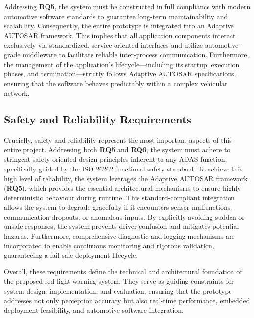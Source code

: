 Addressing \textbf{RQ5}, the system must be constructed in full compliance with modern automotive software standards to guarantee long-term maintainability and scalability. Consequently, the entire prototype is integrated into an Adaptive AUTOSAR framework. This implies that all application components interact exclusively via standardized, service-oriented interfaces and utilize automotive-grade middleware to facilitate reliable inter-process communication. Furthermore, the management of the application's lifecycle---including its startup, execution phases, and termination---strictly follows Adaptive AUTOSAR specifications, ensuring that the software behaves predictably within a complex vehicular network.

\subsection{Safety and Reliability Requirements}
Crucially, safety and reliability represent the most important aspects of this entire project. Addressing both \textbf{RQ5} and \textbf{RQ6}, the system must adhere to stringent safety-oriented design principles inherent to any ADAS function, specifically guided by the ISO 26262 functional safety standard. To achieve this high level of reliability, the system leverages the Adaptive AUTOSAR framework (\textbf{RQ5}), which provides the essential architectural mechanisms to ensure highly deterministic behaviour during runtime. This standard-compliant integration allows the system to degrade gracefully if it encounters sensor malfunctions, communication dropouts, or anomalous inputs. By explicitly avoiding sudden or unsafe responses, the system prevents driver confusion and mitigates potential hazards. Furthermore, comprehensive diagnostic and logging mechanisms are incorporated to enable continuous monitoring and rigorous validation, guaranteeing a fail-safe deployment lifecycle.

Overall, these requirements define the technical and architectural foundation of the proposed red-light warning system. They serve as guiding constraints for system design, implementation, and evaluation, ensuring that the prototype addresses not only perception accuracy but also real-time performance, embedded deployment feasibility, and automotive software integration.
